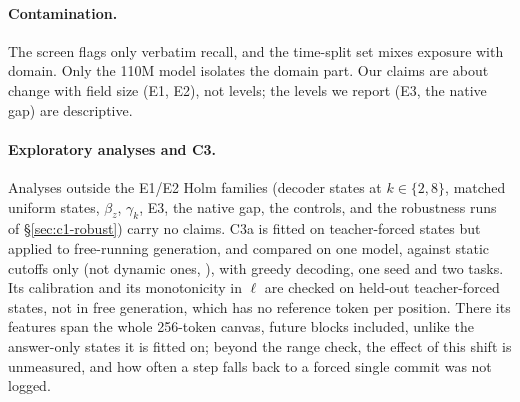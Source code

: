 \paragraph{Contamination.}
The screen flags only verbatim recall, and the time-split set mixes exposure with domain. Only
the 110M model isolates the domain part. Our claims are about change with field size (E1, E2),
not levels; the levels we report (E3, the native gap) are descriptive.

\paragraph{Exploratory analyses and C3.}
Analyses outside the E1/E2 Holm families (decoder states at $k\in\{2,8\}$, matched uniform states,
$\beta_z$, $\gamma_k$, E3, the native gap, the controls, and the robustness runs of \S\ref{sec:c1-robust}) carry no claims. C3a is fitted on
teacher-forced states but applied to free-running generation, and compared on one model, against static cutoffs only (not dynamic ones, \citealt{shen2025osdt}), with
greedy decoding, one seed and two tasks. Its calibration and its monotonicity in $\ell$ are checked
on held-out teacher-forced states, not in free generation, which has no reference token per position.
There its features span the whole 256-token canvas, future blocks included, unlike the answer-only
states it is fitted on; beyond the range check, the effect of this shift is unmeasured, and how often a
step falls back to a forced single commit was not logged.

